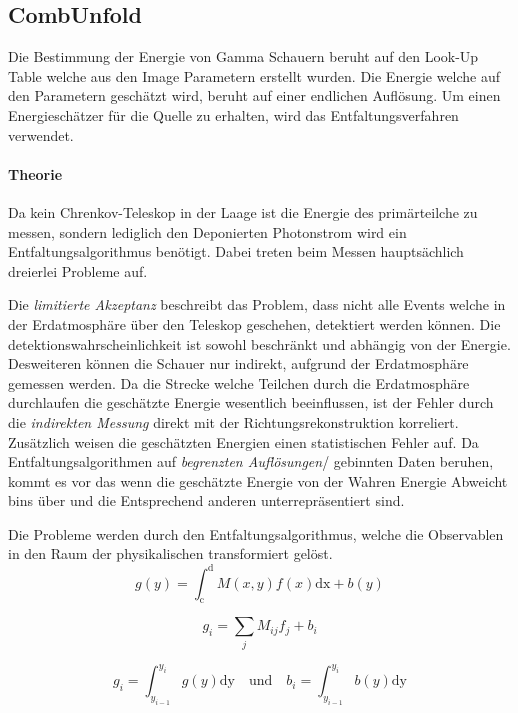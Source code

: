 \subsection{CombUnfold}%
\label{sub:combunfold}
Die Bestimmung der Energie von Gamma Schauern beruht auf den Look-Up Table
welche aus den Image Parametern erstellt wurden. 
Die Energie welche auf den Parametern geschätzt wird, beruht auf einer 
endlichen Auflösung.
Um einen Energieschätzer für die Quelle zu erhalten, 
wird das Entfaltungsverfahren verwendet.

\paragraph{Theorie}%
\label{par:theorie}
Da kein Chrenkov-Teleskop in der Laage ist die Energie 
des primärteilche zu messen,
sondern lediglich den Deponierten Photonstrom wird ein Entfaltungsalgorithmus
benötigt.
Dabei treten beim Messen hauptsächlich dreierlei Probleme auf.

Die \textit{limitierte Akzeptanz} beschreibt das Problem, 
dass nicht alle Events welche in der Erdatmosphäre über den Teleskop geschehen,
detektiert werden können. 
Die detektionswahrscheinlichkeit ist sowohl beschränkt 
und abhängig von der Energie.
Desweiteren können die Schauer nur indirekt, 
aufgrund der Erdatmosphäre gemessen werden.
Da die Strecke welche Teilchen durch die Erdatmosphäre durchlaufen die
geschätzte Energie wesentlich beeinflussen,
ist der Fehler durch die \textit{indirekten Messung} direkt mit der
Richtungsrekonstruktion korreliert.
Zusätzlich weisen die geschätzten Energien einen statistischen Fehler auf. 
Da Entfaltungsalgorithmen auf \textit{begrenzten Auflösungen}/ gebinnten Daten
beruhen, kommt es vor das wenn die geschätzte Energie von der Wahren Energie
Abweicht bins über und die Entsprechend anderen unterrepräsentiert sind.

Die Probleme werden durch den Entfaltungsalgorithmus,
welche die Observablen in den Raum der physikalischen transformiert 
gelöst.
\begin{equation}
	g(y) = \int_\text{c}^\text{d} M(x,y) f(x) \text{dx} + b(y)
\end{equation}

\begin{equation}
	g_i = \sum_j M_{ij} f_j + b_i
\end{equation}

\begin{equation}
	g_i = \int_{y_{i-1}}^{y_i} g(y) \text{dy} \quad \text{und} \quad
	b_i = \int_{y_{i-1}}^{y_i} b(y) \text{dy}
\end{equation}

